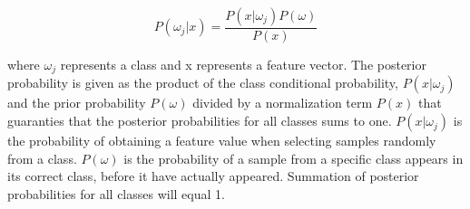 \begin{equation}
P(\omega_j|x) = \frac{P(x|\omega_j)P(\omega)}{P(x)}
\end{equation}

where $\omega_j$ represents a class and x represents a feature vector. The posterior probability is given as the product of the class conditional probability, $P(x|\omega_j)$ and the prior probability $P(\omega)$ divided by a normalization term $P(x)$ that guaranties that the posterior probabilities for all classes sums to one. $P(x|\omega_j)$ is the probability of obtaining a feature value when selecting samples randomly from a class. $P(\omega)$ is the probability of a sample from a specific class appears in its correct class, before it have actually appeared. Summation of posterior probabilities for all classes will equal 1.
